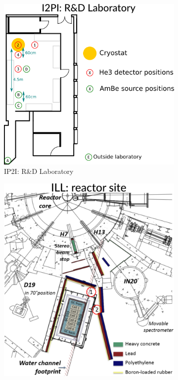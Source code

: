 \begin{figure}
\centering
\begin{subfigure}{.5\textwidth}
  \centering
  \includegraphics[width=\linewidth]{Figures/Neutron/scheme_ip2i.png}
  \caption{IP2I: R\&D Laboratory}
  \label{fig:scheme-ill}
\end{subfigure}%
\begin{subfigure}{0.5\textwidth}
  \centering
  \includegraphics[width=\linewidth]{Figures/Neutron/scheme_ill.png}

\end{subfigure}
\end{figure}
